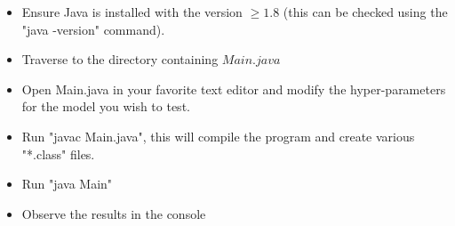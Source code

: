 \documentclass[10pt, a4paper, twocolumn]{article}
\begin{document}
\begin{itemize}
\item Ensure Java is installed with the version $\geq 1.8$ (this can be checked using the "java -version" command).
\item Traverse to the directory containing $Main.java$
\item Open Main.java in your favorite text editor and modify the hyper-parameters for the model you wish to test.
\item Run "javac Main.java", this will compile the program and create various "*.class" files.
\item Run "java Main"
\item Observe the results in the console
\end{itemize}


\printbibliography[title={Bibliography}] %

\end{document}
